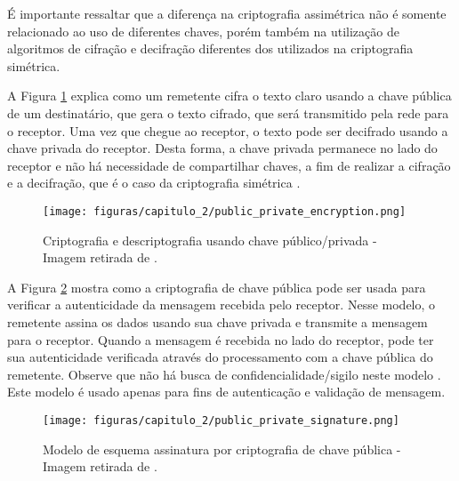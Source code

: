 		É importante ressaltar que a diferença na criptografia assimétrica não é somente relacionado ao uso de diferentes chaves, porém também na utilização de algoritmos de cifração e decifração diferentes dos utilizados na criptografia simétrica.

                A Figura \ref{fig:public_private_encryption} explica como um remetente cifra o texto claro usando a chave pública de um destinatário, que gera o texto cifrado, que será transmitido pela rede para o receptor. Uma vez que chegue ao receptor, o texto pode ser decifrado usando a chave privada do receptor. Desta forma, a chave privada permanece no lado do receptor e não há necessidade de compartilhar chaves, a fim de realizar a cifração e a decifração, que é o caso da criptografia simétrica \cite{mastering_blockchain}.

                    \begin{figure}[h]
                         \centering
                         \texttt{[image: figuras/capitulo\_2/public\_private\_encryption.png]}
                         \caption{Criptografia e descriptografia usando chave público/privada - Imagem retirada de \cite{mastering_blockchain}.}
                         \label{fig:public_private_encryption}
                    \end{figure}
                    
                    
                A Figura \ref{fig:public_private_signature} mostra como a criptografia de chave pública pode ser usada para verificar a autenticidade da mensagem recebida pelo receptor. Nesse modelo, o remetente assina os dados usando sua chave privada e transmite a mensagem para o receptor. Quando a mensagem é recebida no lado do receptor, pode ter sua autenticidade verificada através do processamento com a chave pública do remetente. Observe que não há busca de confidencialidade/sigilo neste modelo \cite{mastering_blockchain}. Este modelo é usado apenas para fins de autenticação e validação de mensagem.
                    
                    \begin{figure}[h]
                         \centering
                         \texttt{[image: figuras/capitulo\_2/public\_private\_signature.png]}
                         \caption{Modelo de esquema assinatura por criptografia de chave pública - Imagem retirada de \cite{mastering_blockchain}.}
                         \label{fig:public_private_signature}
                    \end{figure}
                    
